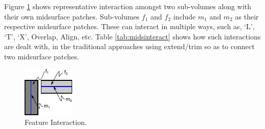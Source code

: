  Figure \ref{fig_featinter}  shows representative interaction amongst two sub-volumes along with their own midsurface patches. Sub-volumes $f_1$ and $f_2$ include $m_1$ and $m_2$ as their respective midsurface patches. These can interact in multiple ways, such as, `L', `T', `X', Overlap, Align, etc.
Table \ref{tab:midsinteract} shows how such interactions are dealt with, in the traditional approaches\cite{Rezayat1996, Woo2014, Boussuge2013, Boussuge2013a} using extend/trim so as to connect two midsurface patches. 
%
%
%
%
\begin{figure}[h!]
	\centering 
	\includegraphics[width=0.35\linewidth]{../Common/images/FeatureInteraction_nonAbel.pdf}
	\caption{Feature Interaction. }
	\label{fig_featinter}
	\end{figure}
	

